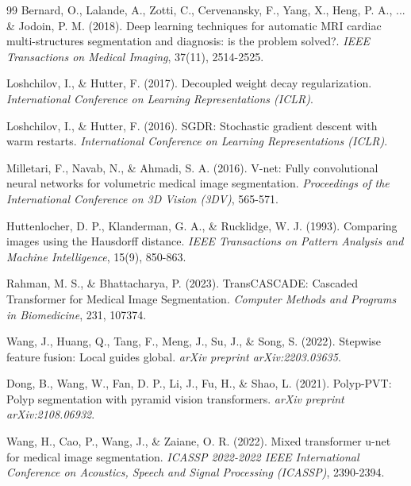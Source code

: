 \documentclass[letterpaper, 10 pt, conference]{ieeeconf}  %
\begin{document}
\begin{thebibliography}{99}
Bernard, O., Lalande, A., Zotti, C., Cervenansky, F., Yang, X., Heng, P. A., ... \& Jodoin, P. M. (2018). Deep learning techniques for automatic MRI cardiac multi-structures segmentation and diagnosis: is the problem solved?. \textit{IEEE Transactions on Medical Imaging}, 37(11), 2514-2525.

Loshchilov, I., \& Hutter, F. (2017). Decoupled weight decay regularization. \textit{International Conference on Learning Representations (ICLR)}.

Loshchilov, I., \& Hutter, F. (2016). SGDR: Stochastic gradient descent with warm restarts. \textit{International Conference on Learning Representations (ICLR)}.

Milletari, F., Navab, N., \& Ahmadi, S. A. (2016). V-net: Fully convolutional neural networks for volumetric medical image segmentation. \textit{Proceedings of the International Conference on 3D Vision (3DV)}, 565-571.

Huttenlocher, D. P., Klanderman, G. A., \& Rucklidge, W. J. (1993). Comparing images using the Hausdorff distance. \textit{IEEE Transactions on Pattern Analysis and Machine Intelligence}, 15(9), 850-863.



Rahman, M. S., \& Bhattacharya, P. (2023). TransCASCADE: Cascaded Transformer for Medical Image Segmentation. \textit{Computer Methods and Programs in Biomedicine}, 231, 107374.

Wang, J., Huang, Q., Tang, F., Meng, J., Su, J., \& Song, S. (2022). Stepwise feature fusion: Local guides global. \textit{arXiv preprint arXiv:2203.03635}.

Dong, B., Wang, W., Fan, D. P., Li, J., Fu, H., \& Shao, L. (2021). Polyp-PVT: Polyp segmentation with pyramid vision transformers. \textit{arXiv preprint arXiv:2108.06932}.

Wang, H., Cao, P., Wang, J., \& Zaiane, O. R. (2022). Mixed transformer u-net for medical image segmentation. \textit{ICASSP 2022-2022 IEEE International Conference on Acoustics, Speech and Signal Processing (ICASSP)}, 2390-2394.


\end{thebibliography}
\end{document}
